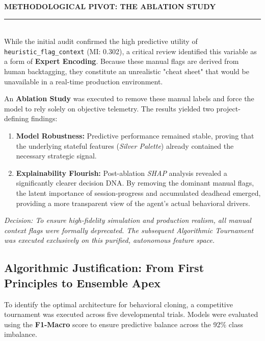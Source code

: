 \vspace{0.4cm}
\begin{tcolorbox}[
    enhanced, sharp corners, boxrule=0.5pt,
    colframe=gray!50, colback=gray!5,
    left=15pt, right=15pt, top=10pt, bottom=10pt
]
    \sffamily\small
    \textbf{METHODOLOGICAL PIVOT: THE ABLATION STUDY} \\
    \rule{12cm}{0.4pt} \\
    \vspace{0.2cm}
    \rmfamily
    While the initial audit confirmed the high predictive utility of \texttt{heuristic\_flag\_context} (MI: 0.302), a critical review identified this variable as a form of \textbf{Expert Encoding}. Because these manual flags are derived from human backtagging, they constitute an unrealistic "cheat sheet" that would be unavailable in a real-time production environment. 

    \vspace{0.2cm}
    An \textbf{Ablation Study} was executed to remove these manual labels and force the model to rely solely on objective telemetry. The results yielded two project-defining findings:
    \begin{enumerate}[noitemsep, topsep=2pt]
        \item \textbf{Model Robustness:} Predictive performance remained stable, proving that the underlying stateful features (\textit{Silver Palette}) already contained the necessary strategic signal.
        \item \textbf{Explainability Flourish:} Post-ablation \textit{SHAP} analysis revealed a significantly clearer decision DNA. By removing the dominant manual flags, the latent importance of session-progress and accumulated deadhead emerged, providing a more transparent view of the agent's actual behavioral drivers.
    \end{enumerate}
    
    \vspace{0.2cm}
    \textit{Decision: To ensure high-fidelity simulation and production realism, all manual context flags were formally deprecated. The subsequent Algorithmic Tournament was executed exclusively on this purified, autonomous feature space.}
\end{tcolorbox}
\vspace{0.4cm}


\subsection{Algorithmic Justification: From First Principles to Ensemble Apex}
To identify the optimal architecture for behavioral cloning, a competitive tournament was executed across five developmental trials. Models were evaluated using the \textbf{F1-Macro} score to ensure predictive balance across the 92\% class imbalance.

